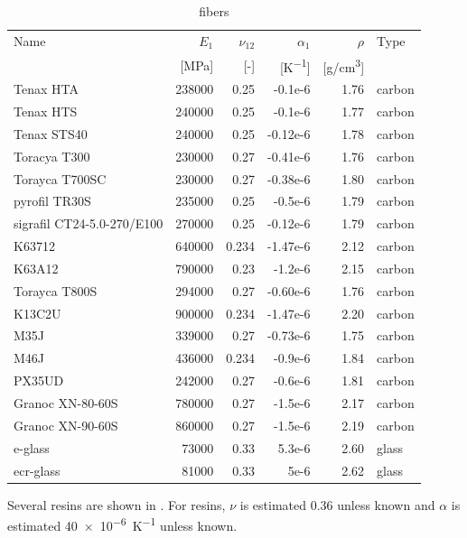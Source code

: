 \documentclass[a4paper,landscape,oneside,11pt,twocolumn]{memoir}
\begin{document}
\begin{table}[!htbp]
  \centering
  \caption{\label{tb:fibers}fibers}
  \begin{tabular}{lrrrrl}%
      Name & $E_1$ & $\nu_{12}$ & $\alpha_1$ & $\rho$ & Type\\
      & [\si{MPa}] & [-] & [\si{K^{-1}}] & [\si{g/cm^3}]\\
    \midrule
      Tenax HTA & 238000 & 0.25 & -0.1e-6 & 1.76 & carbon\\
Tenax HTS & 240000 & 0.25 & -0.1e-6 & 1.77 & carbon\\
Tenax STS40 & 240000 & 0.25 & -0.12e-6 & 1.78 & carbon\\
Toracya T300 & 230000 & 0.27 & -0.41e-6 & 1.76 & carbon\\
Torayca T700SC & 230000 & 0.27 & -0.38e-6 & 1.80 & carbon\\
pyrofil TR30S & 235000 & 0.25 & -0.5e-6 & 1.79 & carbon\\
sigrafil CT24-5.0-270/E100 & 270000 & 0.25 & -0.12e-6 & 1.79 & carbon\\
K63712 & 640000 & 0.234 & -1.47e-6 & 2.12 & carbon\\
K63A12 & 790000 & 0.23 & -1.2e-6 & 2.15 & carbon\\
Torayca T800S & 294000 & 0.27 & -0.60e-6 & 1.76 & carbon\\
K13C2U & 900000 & 0.234 & -1.47e-6 & 2.20 & carbon\\
M35J & 339000 & 0.27 & -0.73e-6 & 1.75 & carbon\\
M46J & 436000 & 0.234 & -0.9e-6 & 1.84 & carbon\\
PX35UD & 242000 & 0.27 & -0.6e-6 & 1.81 & carbon\\
Granoc XN-80-60S & 780000 & 0.27 & -1.5e-6 & 2.17 & carbon\\
Granoc XN-90-60S & 860000 & 0.27 & -1.5e-6 & 2.19 & carbon\\
e-glass & 73000 & 0.33 & 5.3e-6 & 2.60 & glass\\
ecr-glass & 81000 & 0.33 & 5e-6 & 2.62 & glass\\
  \end{tabular}
\end{table}

Several resins are shown in . For resins, $\nu$ is estimated
0.36 unless known and $\alpha$ is estimated \SI{40e-6}{K^{-1}} unless known.
\end{document}
